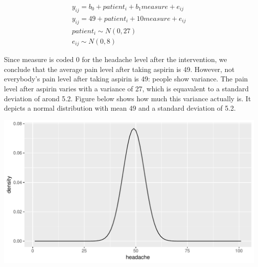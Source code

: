 \documentclass[]{report}\usepackage[]{graphicx}\usepackage[]{color}
\makeatletter
\def\maxwidth{ %
  \ifdim\Gin@nat@width>\linewidth
    \linewidth
  \else
    \Gin@nat@width
  \fi
}
\newenvironment{knitrout}{}{} %
\makeatother
\begin{document}
\begin{eqnarray}
y_{ij} = b_0 + patient_i + b_1 measure + e_{ij} \\
y_{ij} = 49 + patient_i + 10 measure + e_{ij} \\
patient_i \sim N(0, 27)\\
e_{ij} \sim N(0, 8)
\end{eqnarray}

Since measure is coded 0 for the headache level after the intervention, we conclude that the average pain level after taking aspirin is 49. However, not everybody's pain level after taking aspirin is 49: people show variance. The pain level after aspirin varies with a variance of 27, which is equavalent to a standard deviation of arond 5.2. Figure below shows how much this variance actually is. It depicts a normal distribution with mean 49 and a standard deviation of 5.2.


\begin{knitrout}
\color{fgcolor}

{\centering \includegraphics[width=\maxwidth]{figure/resultsprepost1-1} 

}



\end{knitrout}
\end{document}
